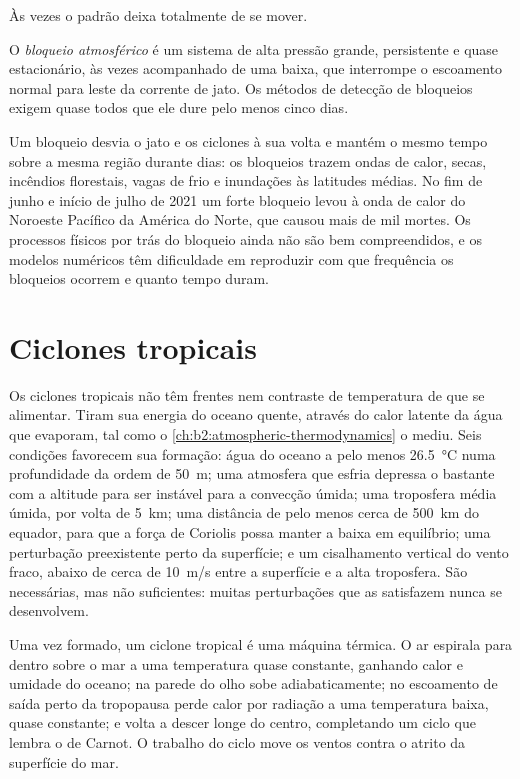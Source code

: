 Às vezes o padrão deixa totalmente de se mover.

\begin{definition}\label{def:b2:weather-systems:blocking}
O \emph{bloqueio atmosférico} é um sistema de alta pressão grande, persistente e quase
estacionário, às vezes acompanhado de uma baixa, que interrompe o escoamento normal para leste
da corrente de jato. Os métodos de detecção de bloqueios exigem quase todos que ele dure pelo menos cinco
dias.
\end{definition}

Um bloqueio desvia o jato e os ciclones à sua volta e mantém o mesmo tempo sobre a mesma
região durante dias: os bloqueios trazem ondas de calor, secas, incêndios florestais, vagas de frio e inundações às
latitudes médias. No fim de junho e início de julho de 2021 um forte bloqueio levou à onda de calor do
Noroeste Pacífico da América do Norte, que causou mais de mil mortes. Os processos
físicos por trás do bloqueio ainda não são bem compreendidos, e os modelos numéricos têm dificuldade em
reproduzir com que frequência os bloqueios ocorrem e quanto tempo duram.

\section{Ciclones tropicais}\label{sec:b2:weather-systems:tropical}

Os ciclones tropicais não têm frentes nem contraste de temperatura de que se alimentar. Tiram sua energia
do oceano quente, através do calor latente da água que evaporam, tal como o \cref{ch:b2:atmospheric-thermodynamics}
o mediu. Seis condições favorecem sua formação: água do oceano a pelo menos \qty{26.5}{\celsius}
numa profundidade da ordem de \qty{50}{m}; uma atmosfera que esfria depressa o bastante com a altitude para
ser instável para a convecção úmida; uma troposfera média úmida, por volta de \qty{5}{km}; uma distância de
pelo menos cerca de \qty{500}{km} do equador, para que a força de Coriolis possa manter a baixa em
equilíbrio; uma perturbação preexistente perto da superfície; e um cisalhamento vertical do vento fraco, abaixo de cerca de
\qty{10}{m/s} entre a superfície e a alta troposfera. São necessárias, mas não
suficientes: muitas perturbações que as satisfazem nunca se desenvolvem.

Uma vez formado, um ciclone tropical é uma máquina térmica. O ar espirala para dentro sobre o mar a uma temperatura
quase constante, ganhando calor e umidade do oceano; na parede do olho sobe
adiabaticamente; no escoamento de saída perto da tropopausa perde calor por radiação a uma temperatura baixa,
quase constante; e volta a descer longe do centro, completando um ciclo que
lembra o de Carnot. O trabalho do ciclo move os ventos contra o atrito da superfície
do mar.

